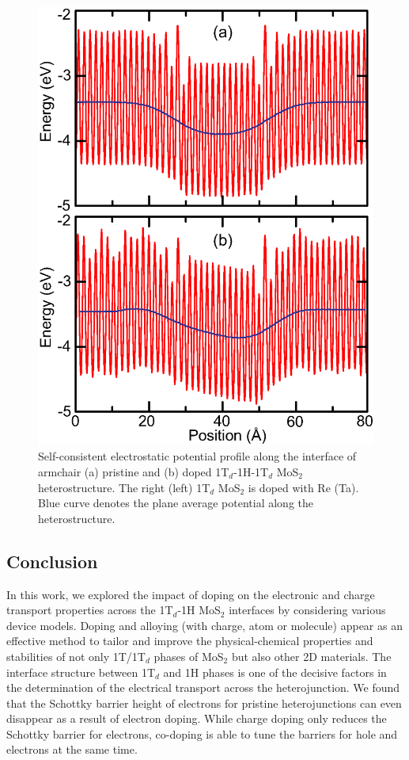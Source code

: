 \begin{figure}[htb]
\centering
\includegraphics[width=0.8\linewidth]{potential.eps}
\caption{\label{potential}Self-consistent electrostatic potential profile along the interface of armchair (a) pristine and (b) doped 1T$_d$-1H-1T$_d$ MoS$_2$ heterostructure.  The right (left) 1T$_d$ MoS$_2$ is doped with Re (Ta). Blue curve denotes the plane average potential along the heterostructure. }
\end{figure}

\subsection{Conclusion}
In this work, we explored the impact of doping on the electronic and charge transport properties across the 1T$_d$-1H MoS$_2$ interfaces by considering various device models. 
Doping and alloying (with charge, atom or molecule) 
appear as an effective method to tailor and improve the physical-chemical properties and stabilities of not 
only 1T/1T$_d$ phases of MoS$_2$ but also other 2D materials. 
The interface structure between 1T$_d$ and 1H phases is one of the decisive factors in the determination of the electrical transport across the heterojunction. 
We found that the Schottky barrier height of electrons for  pristine heterojunctions  can even disappear as a result of electron doping. 
While charge doping only reduces the Schottky barrier for electrons, co-doping is able to tune the barriers for
hole and electrons at the same time.


